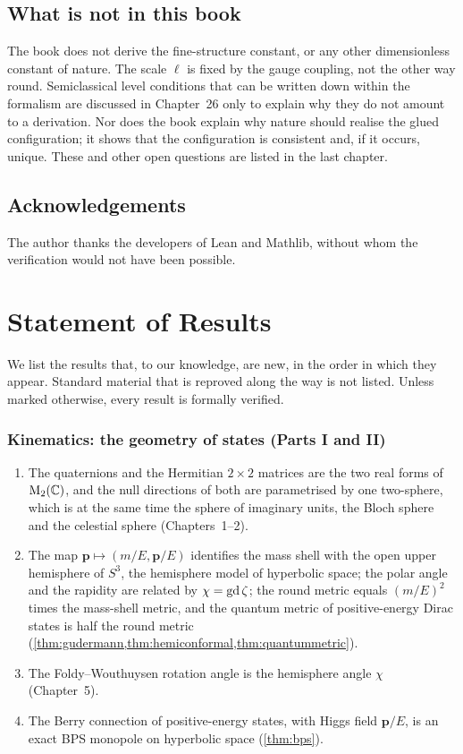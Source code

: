 \section*{What is not in this book}

The book does not derive the fine-structure constant, or any other dimensionless constant of nature. The scale $\ell$ is fixed by the gauge coupling, not the other way round. Semiclassical level conditions that can be written down within the formalism are discussed in Chapter~26 only to explain why they do not amount to a derivation. Nor does the book explain why nature should realise the glued configuration; it shows that the configuration is consistent and, if it occurs, unique. These and other open questions are listed in the last chapter.

\section*{Acknowledgements}

The author thanks the developers of Lean and Mathlib, without whom the verification would not have been possible.

\chapter*{Statement of Results}

We list the results that, to our knowledge, are new, in the order in which they appear. Standard material that is reproved along the way is not listed. Unless marked otherwise, every result is formally verified.

\subsection*{Kinematics: the geometry of states (Parts I and II)}
\begin{enumerate}[label=R\arabic*.,leftmargin=*]
\item The quaternions and the Hermitian $2\times2$ matrices are the two real forms of $\mathrm{M}_2(\mathbb{C})$, and the null directions of both are parametrised by one two-sphere, which is at the same time the sphere of imaginary units, the Bloch sphere and the celestial sphere (Chapters~1--2).
\item The map $\mathbf p\mapsto(m/E,\mathbf p/E)$ identifies the mass shell with the open upper hemisphere of $S^3$, the hemisphere model of hyperbolic space; the polar angle and the rapidity are related by $\chi=\operatorname{gd}\zeta$; the round metric equals $(m/E)^2$ times the mass-shell metric, and the quantum metric of positive-energy Dirac states is half the round metric (\cref{thm:gudermann,thm:hemiconformal,thm:quantummetric}).
\item The Foldy--Wouthuysen rotation angle is the hemisphere angle $\chi$ (Chapter~5).
\item The Berry connection of positive-energy states, with Higgs field $\mathbf p/E$, is an exact BPS monopole on hyperbolic space (\cref{thm:bps}).
\end{enumerate}

